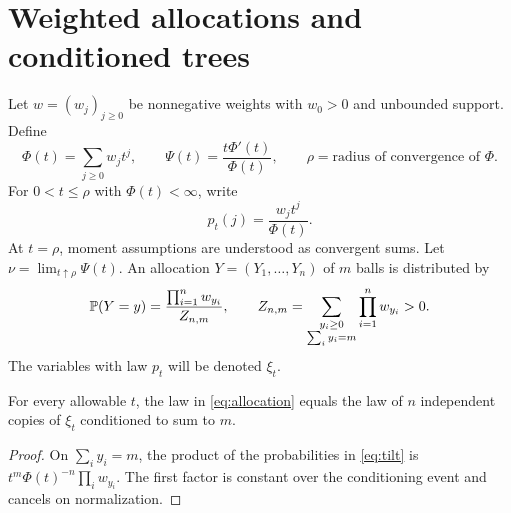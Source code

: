 \section{Weighted allocations and conditioned trees}\label{sec:allocations}
Let $w=(w_j)_{j\ge0}$ be nonnegative weights with $w_0>0$ and unbounded support. Define
\[
 \Phi(t)=\sum_{j\ge0}w_jt^j,\qquad
 \Psi(t)=\frac{t\Phi'(t)}{\Phi(t)},\qquad
 \rho=\text{radius of convergence of }\Phi.
\]
For $0<t\le\rho$ with $\Phi(t)<\infty$, write
\begin{equation}\label{eq:tilt}
 p_t(j)=\frac{w_jt^j}{\Phi(t)}.
\end{equation}
At $t=\rho$, moment assumptions are understood as convergent sums. Let $\nu=\lim_{t\uparrow\rho}\Psi(t)$. An allocation $Y=(Y_1,\ldots,Y_n)$ of $m$ balls is distributed by
\begin{equation}\label{eq:allocation}
 \mathbb P(Y=y)=\frac{\prod_{i=1}^nw_{y_i}}{Z_{n,m}},\qquad
 Z_{n,m}=\sum_{\substack{y_i\ge0\\\sum_i y_i=m}}\prod_{i=1}^nw_{y_i}>0.
\end{equation}
The variables with law $p_t$ will be denoted $\xi_t$.

\begin{lemma}\label{lem:allocation}
For every allowable $t$, the law in \eqref{eq:allocation} equals the law of $n$ independent copies of $\xi_t$ conditioned to sum to $m$.
\end{lemma}
\begin{proof}
On $\sum_i y_i=m$, the product of the probabilities in \eqref{eq:tilt} is $t^m\Phi(t)^{-n}\prod_iw_{y_i}$. The first factor is constant over the conditioning event and cancels on normalization.
\end{proof}


